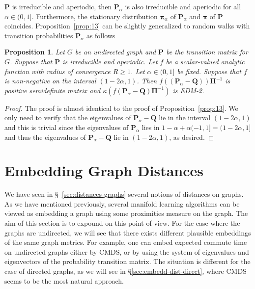 \documentclass[10pt,twocolumn]{article}
\newtheorem{proposition}[theorem]{Proposition}
\numberwithin{equation}{section}
\begin{document}
$\mathbf{P}$ is irreducible and aperiodic, then
$\mathbf{P}_{\alpha}$ is also irreducible and aperiodic for
all $\alpha \in (0,1]$. Furthermore, the stationary distribution
$\bm{\pi}_{\alpha}$ of $\mathbf{P}_{\alpha}$ and $\bm{\pi}$ of $\mathbf{P}$ 
coincides. Proposition~\ref{prop:13} can be slightly 
generalized to random walks with transition probabilities
$\mathbf{P}_{\alpha}$ as follows
\begin{proposition}
  \label{prop:8}
  Let $G$ be an undirected graph and $\mathbf{P}$ be the transition
  matrix for 
  $G$. Suppose that $\mathbf{P}$ is irreducible and aperiodic.  Let
  $f$ be a scalar-valued analytic function with radius of convergence
  $R \geq 1$. Let $\alpha \in (0,1]$ be fixed. Suppose that $f$ is
  non-negative on the interval $(1 - 2\alpha,1)$. Then $f((\mathbf{P}_{\alpha}
  - \mathbf{Q}))\bm{\Pi}^{-1}$ is positive
  semidefinite matrix and $\kappa(f(\mathbf{P}_{\alpha} -
  \mathbf{Q})\bm{\Pi}^{-1})$ is EDM-2.
\end{proposition}
\begin{proof}
  The proof is almost identical to the proof of Proposition~\ref{prop:13}. We
  only need to verify that the eigenvalues of $\mathbf{P}_{\alpha} - \mathbf{Q}$
  lie in the interval $(1 - 2\alpha, 1)$ and this is trivial since
  the eigenvalues of $\mathbf{P}_{\alpha}$ lies in $1 - \alpha +
  \alpha(-1,1] = (1 - 2\alpha, 1]$ and thus the eigenvalues of
  $\mathbf{P}_{\alpha} - \mathbf{Q}$ lie in $(1 - 2\alpha, 1)$, as desired.
\end{proof}

\section{Embedding Graph Distances}
\label{sec:from-dist-embedd}
We have seen in \S~\ref{sec:distances-graphs} several notions of
distances on graphs. As we have mentioned previously, several manifold
learning algorithms can be viewed as embedding a graph using some
proximities measure on the graph. The aim of this section is to
expound on this point of view. For the case where the graphs are
undirected, we will see that there exists different plausible
embeddings of the same graph metrics. For example, one can embed
expected commute time on undirected graphs either by CMDS, or
by using the system of eigenvalues and eigenvectors of the probability
transition matrix. The situation is different for the case of directed
graphs, as we will see in \S \ref{sec:embedd-dist-direct}, where
CMDS seems to be the most natural approach.
%
\end{document}
